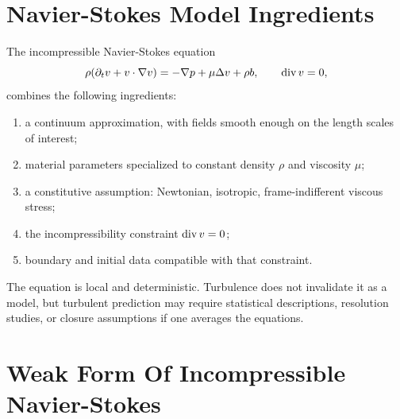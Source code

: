 \section{Navier-Stokes Model Ingredients}
\label{sec:navier-stokes-model-ingredients}

The incompressible Navier-Stokes equation
\[
        \rho(\partial_t v+v\cdot\nabla v)
        =
        -\nabla p+\mu\Delta v+\rho b,\qquad
        \operatorname{div} v=0,
\]
combines the following ingredients:
\begin{enumerate}
\item a continuum approximation, with fields smooth enough on the length scales
of interest;
\item material parameters specialized to constant density \(\rho\) and viscosity
\(\mu\);
\item a constitutive assumption: Newtonian, isotropic, frame-indifferent
viscous stress;
\item the incompressibility constraint \(\operatorname{div} v=0\);
\item boundary and initial data compatible with that constraint.
\end{enumerate}
The equation is local and deterministic.  Turbulence does not invalidate it as
a model, but turbulent prediction may require statistical descriptions,
resolution studies, or closure assumptions if one averages the equations.

\section{Weak Form Of Incompressible Navier-Stokes}
\label{sec:weak-navier-stokes}

